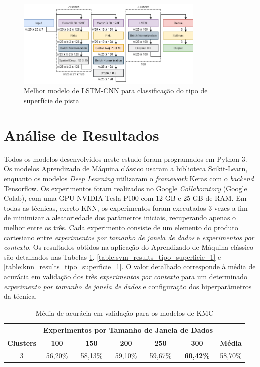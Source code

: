 \begin{figure}[h]
  \centering
  \caption{Melhor modelo de LSTM-CNN para classificação do tipo de superfície de pista}
  \label{fig:best_cnn_lstm_tipo_superficie_1}
  \includegraphics[width=0.8\textwidth]{figuras/fig_33.png}
\end{figure}

\vspace{-1.0cm}
\section{Análise de Resultados}

Todos os modelos desenvolvidos neste estudo foram programados em Python 3. Os modelos Aprendizado de Máquina clássico usaram a biblioteca Scikit-Learn, enquanto os modelos \textit{Deep Learning} utilizaram o \textit{framework} Keras com o \textit{backend} Tensorflow. Os experimentos foram realizados no Google \textit{Collaboratory} (Google Colab), com uma GPU NVIDIA Tesla P100 com 12 GB e 25 GB de RAM. Em todas as técnicas, exceto KNN, os experimentos foram executados 3 vezes a fim de minimizar a aleatoriedade dos parâmetros iniciais, recuperando apenas o melhor entre os três. Cada experimento consiste de um elemento do produto cartesiano entre \emph{experimentos por tamanho de janela de dados} e \emph{experimentos por contexto}. Os resultados obtidos na aplicação do Aprendizado de Máquina clássico são detalhados nas Tabelas \ref{table:kmc_results_tipo_superficie_1}, \ref{table:svm_results_tipo_superficie_1} e \ref{table:knn_results_tipo_superficie_1}. O valor detalhado corresponde à média de acurácia em  validação dos três \textit{experimentos por contexto} para um determinado \emph{experimento por tamanho de janela de dados} e configuração dos hiperparâmetros da técnica.

\begin{table}[H]
\scriptsize
\centering
\caption{Média de acurácia em validação para os modelos de KMC} 
\label{table:kmc_results_tipo_superficie_1}
\begin{tabular}{ccccccc}
\cmidrule(lr){2-6}
& \multicolumn{5}{c}{\textbf{Experimentos por Tamanho de Janela de Dados}} & \multicolumn{1}{c}{} \\ \midrule
\textbf{Clusters} & \textbf{100} & \textbf{150} & \textbf{200} & \textbf{250} & \textbf{300} & \textbf{Média} \\ \midrule
3 & 56,20\% & 58,13\% &  59,10\% & 59,67\% & \cellcolor[HTML]{34FF34}\textbf{60,42\%} & 58,70\% \\ \bottomrule
\end{tabular}
\end{table}

